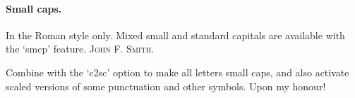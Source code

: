 \documentclass{scrartcl}
\begin{document}
\begin{english}
\paragraph{Small caps.} In the Roman style only. Mixed small and standard capitals are available with the ‘smcp’ feature. \textsc{John F. Smith.}

Combine with the ‘c2sc’ option to make all letters small caps, and also activate scaled versions of some punctuation and other symbols. { Upon my honour!}

\end{english}
\end{document}
